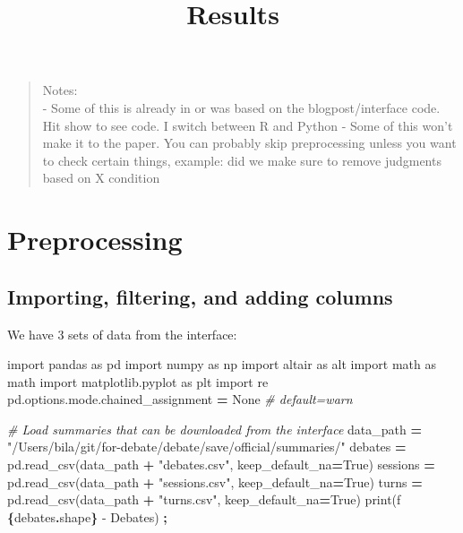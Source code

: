 \documentclass[
]{article}
\title{Results}
\author{}
\date{\vspace{-2.5em}}
\newenvironment{Shaded}{\begin{snugshade}}{\end{snugshade}}
\newcommand{\BuiltInTok}[1]{#1}
\newcommand{\CommentTok}[1]{\textcolor[rgb]{0.56,0.35,0.01}{\textit{#1}}}
\newcommand{\ImportTok}[1]{#1}
\newcommand{\NormalTok}[1]{#1}
\newcommand{\OperatorTok}[1]{\textcolor[rgb]{0.81,0.36,0.00}{\textbf{#1}}}
\newcommand{\SpecialCharTok}[1]{\textcolor[rgb]{0.81,0.36,0.00}{\textbf{#1}}}
\newcommand{\SpecialStringTok}[1]{\textcolor[rgb]{0.31,0.60,0.02}{#1}}
\newcommand{\StringTok}[1]{\textcolor[rgb]{0.31,0.60,0.02}{#1}}
\newcommand{\VariableTok}[1]{\textcolor[rgb]{0.00,0.00,0.00}{#1}}
\begin{document}
\maketitle

\begin{quote}
Notes:\\
- Some of this is already in or was based on the blogpost/interface
code. Hit show to see code. I switch between R and Python - Some of this
won't make it to the paper. You can probably skip preprocessing unless
you want to check certain things, example: did we make sure to remove
judgments based on X condition
\end{quote}

\section{Preprocessing}\label{preprocessing}

\subsection{Importing, filtering, and adding
columns}\label{importing-filtering-and-adding-columns}

We have 3 sets of data from the interface:

\begin{Shaded}
\begin{Highlighting}[]
\ImportTok{import}\NormalTok{ pandas }\ImportTok{as}\NormalTok{ pd}
\ImportTok{import}\NormalTok{ numpy }\ImportTok{as}\NormalTok{ np}
\ImportTok{import}\NormalTok{ altair }\ImportTok{as}\NormalTok{ alt}
\ImportTok{import}\NormalTok{ math }\ImportTok{as}\NormalTok{ math}
\ImportTok{import}\NormalTok{ matplotlib.pyplot }\ImportTok{as}\NormalTok{ plt}
\ImportTok{import}\NormalTok{ re}
\NormalTok{pd.options.mode.chained\_assignment }\OperatorTok{=} \VariableTok{None}  \CommentTok{\# default=\textquotesingle{}warn\textquotesingle{}}

\CommentTok{\# Load summaries that can be downloaded from the interface}
\NormalTok{data\_path }\OperatorTok{=} \StringTok{"/Users/bila/git/for{-}debate/debate/save/official/summaries/"}
\NormalTok{debates }\OperatorTok{=}\NormalTok{ pd.read\_csv(data\_path }\OperatorTok{+} \StringTok{"debates.csv"}\NormalTok{, keep\_default\_na}\OperatorTok{=}\VariableTok{True}\NormalTok{)}
\NormalTok{sessions }\OperatorTok{=}\NormalTok{ pd.read\_csv(data\_path }\OperatorTok{+} \StringTok{"sessions.csv"}\NormalTok{, keep\_default\_na}\OperatorTok{=}\VariableTok{True}\NormalTok{)}
\NormalTok{turns }\OperatorTok{=}\NormalTok{ pd.read\_csv(data\_path }\OperatorTok{+} \StringTok{"turns.csv"}\NormalTok{, keep\_default\_na}\OperatorTok{=}\VariableTok{True}\NormalTok{)}
\BuiltInTok{print}\NormalTok{(}\SpecialStringTok{f\textquotesingle{} }\SpecialCharTok{\{}\NormalTok{debates}\SpecialCharTok{.}\NormalTok{shape}\SpecialCharTok{\}}\SpecialStringTok{ {-} Debates\textquotesingle{}}\NormalTok{) }\OperatorTok{;}
\end{Highlighting}
\end{Shaded}
\end{document}
